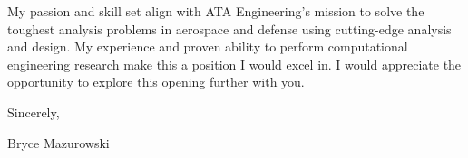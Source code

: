 \documentclass{resume}
\begin{document}
My passion and skill set align with ATA Engineering's mission to solve
the toughest analysis problems in aerospace and defense using
cutting-edge analysis and design.
%
My experience and proven ability to perform computational engineering research
make this a position I would excel in.
%
I would appreciate the opportunity to explore this opening further with you.
%


Sincerely,

Bryce Mazurowski
\end{document}
